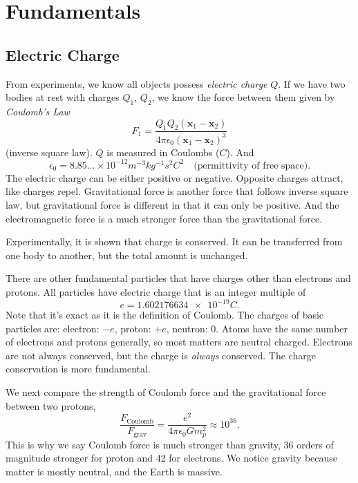 \section{Fundamentals}
\subsection{Electric Charge}
From experiments, we know all objects possess \textit{electric charge} \(Q\). If we have two bodies at rest with charges \(Q_1\), \(Q_2\), we know the force between them given by \textit{Coulomb's Law}
\[
    F_1 = \frac{Q_1 Q_2 (\mathbf{x} _1 - \mathbf{x} _2)}{4\pi \epsilon_0 (\mathbf{x} _1 - \mathbf{x} _2)^3}
\]
(inverse square law). \(Q\) is measured in Coulombs (\(C\)). And
\[
    \epsilon_0 = 8.85 \ldots \times 10^{-12} \unit{m^{-3}kg^{-1}s^{2}C^{2}}\quad\text{(permittivity of free space)}.
\]
The electric charge can be either positive or negative. Opposite charges attract, like charges repel. Gravitational force is another force that follows inverse square law, but gravitational force is different in that it can only be positive. And the electromagnetic force is a much stronger force than the gravitational force.

Experimentally, it is shown that charge is conserved. It can be transferred from one body to another, but the total amount is unchanged.

There are other fundamental particles that have charges other than electrons and protons. All particles have electric charge that is an integer multiple of
\[
    e = \num{1.602176634e-19}\unit{C}.
\]
Note that it's exact as it is the definition of Coulomb. The charges of basic particles are: electron: \(-e\), proton: \(+e\), neutron: \(0\). Atoms have the same number of electrons and protons generally, so most matters are neutral charged. Electrons are not always conserved, but the charge is \textit{always} conserved. The charge conservation is more fundamental.

We next compare the strength of Coulomb force and the gravitational force between two protons,
\[
    \frac{F_{\text{Coulomb}}}{F_{\text{grav}}} = \frac{e^2}{4\pi\epsilon_0 G m_p^2} \approx 10^{36}.
\]
This is why we say Coulomb force is much stronger than gravity, 36 orders of magnitude stronger for proton and 42 for electrons. We notice gravity because matter is mostly neutral, and the Earth is massive.

